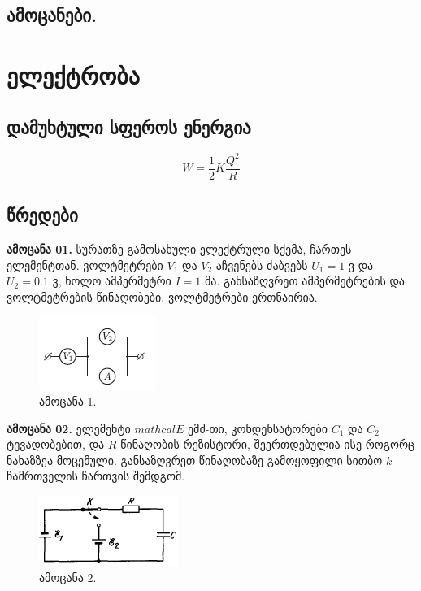 \documentclass{book}
\begin{document}
\section{ამოცანები.}

\chapter{ელექტრობა}
\section{დამუხტული სფეროს ენერგია}
	\begin{equation}
		W = \frac{1}{2}K\frac{Q^2}{R}
	\end{equation}

\section{წრედები}
\textbf{ამოცანა 01.} სურათზე გამოსახული ელექტრული სქემა, ჩართეს ელემენტთან. ვოლტმეტრები $V_1$ და $V_2$ აჩვენებს ძაბვებს $U_1 = 1$ ვ და $U_2 = 0.1$ ვ, ხოლო ამპერმეტრი $I = 1$ მა. განსაზღვრეთ ამპერმეტრების და ვოლტმეტრების წინაღობები. ვოლტმეტრები ერთნაირია.
	\begin{figure}[H]
		\centering
		\includegraphics[width=0.3\columnwidth]{figures/phys852}
		\caption{ამოცანა 1.}
		\label{fig:phys852}
	\end{figure}
\textbf{ამოცანა 02.} ელემენტი $mathcal{E}$ ემძ-თი, კონდენსატორები $C_1$ და $C_2$ ტევადობებით, და $R$ წინაღობის რეზისტორი, შეერთდებულია ისე როგორც ნახაზზეა მოცემული. განსაზღვრეთ წინაღობაზე გამოყოფილი სითბო $k$ ჩამრთველის ჩართვის შემდგომ.
	\begin{figure}[H]
		\centering
		\includegraphics[width=0.3\columnwidth]{figures/phys694}
		\caption{ამოცანა 2.}
		\label{fig:phys694}
	\end{figure}
\end{document}
